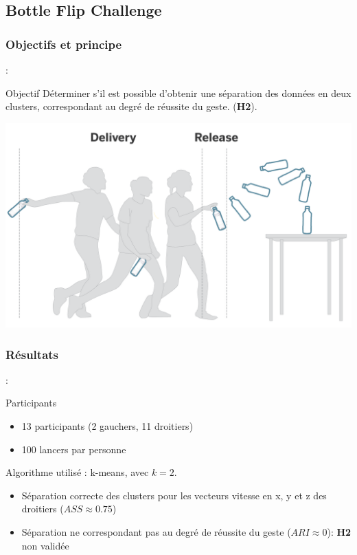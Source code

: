 \documentclass[svgnames]{beamer}
\begin{document}
	\subsection{Bottle Flip Challenge}
	\subsubsection{Objectifs et principe}
	\begin{frame}{\subsecname : \MakeLowercase{\subsubsecname}}
		\begin{block}{Objectif}
			 Déterminer s'il est possible d'obtenir une séparation des données en deux clusters, correspondant au degré de réussite du geste. (\textbf{H2}).
		\end{block}
	
		\centering
		\includegraphics[scale=0.2]{img/BFC_example.png}
	\end{frame}
	
	\subsubsection{Résultats}
	\begin{frame}{\subsecname : \MakeLowercase{\subsubsecname}}
		\begin{block}{Participants}
			\begin{itemize}[label=$\bullet$]
				\item 13 participants (2 gauchers, 11 droitiers)
				\item 100 lancers par personne
			\end{itemize}
		\end{block}

		Algorithme utilisé : k-means, avec $k=2$.
		\begin{itemize}
			\item Séparation correcte des clusters pour les vecteurs vitesse en x, y et z des droitiers ($ASS \approx 0.75$)
			\item Séparation ne correspondant pas au degré de réussite du geste ($ARI \approx 0$): \textbf{H2} non validée
		\end{itemize}
		
	\end{frame}
\end{document}
